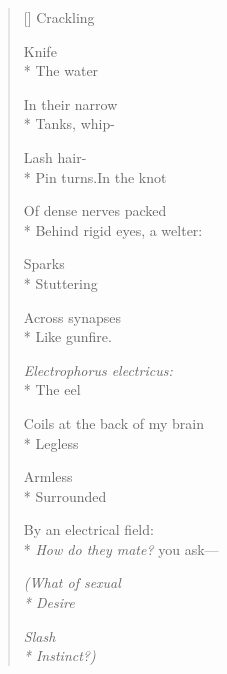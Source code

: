 \label{ch:eels}
\settowidth{\versewidth}{Coils at the back of my brain}
\begin{verse}[\versewidth]
Crackling

Knife\\*
The water

In their narrow\\*
Tanks, whip-

Lash hair-\\*
Pin turns.\qquad In the knot

Of dense nerves packed\\*
Behind rigid eyes, a welter:

Sparks\\*
Stuttering

Across synapses\\*
Like gunfire.

\textit{Electrophorus electricus:}\\*
The eel

Coils at the back of my brain\\*
Legless

Armless\\*
Surrounded

By an electrical field:\\*
\textit{How do they mate?} you ask---

\textit{(What of sexual\\*
Desire}

\textit{Slash\\*
Instinct?)}
\end{verse}
